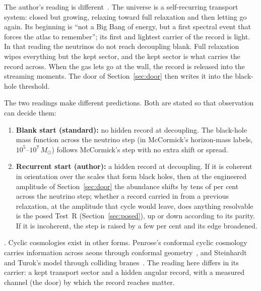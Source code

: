 The author's reading is different~\cite{Atlas}. The universe is a self-recurring transport system: closed but growing, relaxing toward full relaxation and then letting go again. Its beginning is ``not a Big Bang of energy, but a first spectral event that forces the atlas to remember''; its first and lightest carrier of the record is light. In that reading the neutrinos do not reach decoupling blank. Full relaxation wipes everything but the kept sector, and the kept sector is what carries the record across. When the gas lets go at the wall, the record is released into the streaming moments. The door of Section~\ref{sec:door} then writes it into the black-hole threshold.

The two readings make different predictions. Both are stated so that observation can decide them:
\begin{enumerate}
\item \textbf{Blank start (standard):} no hidden record at decoupling. The black-hole mass function across the neutrino step (in McCormick's horizon-mass labels, $10^5$--$10^7\,M_\odot$) follows McCormick's step with no extra shift or spread.
\item \textbf{Recurrent start (author):} a hidden record at decoupling. If it is coherent in orientation over the scales that form black holes, then at the engineered amplitude of Section~\ref{sec:door} the abundance shifts by tens of per cent across the neutrino step; whether a record carried in from a previous relaxation, at the amplitude that cycle would leave, does anything resolvable is the posed Test~R (Section~\ref{sec:posed}), up or down according to its parity. If it is incoherent, the step is raised by a few per cent and its edge broadened.
\end{enumerate}
. Cyclic cosmologies exist in other forms. Penrose's conformal cyclic cosmology carries information across aeons through conformal geometry~\cite{CCC}, and Steinhardt and Turok's model through colliding branes~\cite{ST}. The reading here differs in its carrier: a kept transport sector and a hidden angular record, with a measured channel (the door) by which the record reaches matter.

